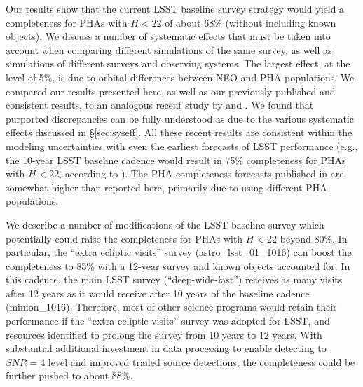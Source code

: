 Our results show that the current LSST baseline survey strategy would yield a completeness for PHAs
with $H<22$ of about 68\% (without including known objects). 
We discuss a number of systematic effects that must be taken into
account when comparing different simulations of the same survey, as well as simulations of different
surveys and observing systems. The largest effect, at the level of 5\%, is due to orbital differences
between NEO and PHA populations. We compared our results presented here, as well as our previously
published and consistent results, to an analogous recent study by \citet[]{GMS2016} and \citet{VeresChesley2017neo}. 
We found that purported discrepancies can be fully understood as due to the various systematic effects discussed in
\S\ref{sec:syseff}. All these recent results are consistent within the modeling uncertainties
with even the earliest forecasts of LSST performance (e.g., the 10-year LSST baseline cadence would 
result in 75\% completeness for PHAs with $H<22$, according to \citealt{IvezicNEO2007}). The 
PHA completeness forecasts published in \cite{LSSToverview} are somewhat higher than reported
here, primarily due to using different PHA populations. 

We describe a number of modifications of the LSST baseline survey which potentially could raise the
completeness for PHAs with $H<22$ beyond 80\%. In particular, the ``extra ecliptic visits'' survey
(astro\_lsst\_01\_1016) can boost the completeness to 85\% with a 12-year survey and known objects
accounted for. In this cadence, the main LSST survey (``deep-wide-fast'')
receives as many visits after 12 years as it would receive after 10 years of the
baseline cadence (minion\_1016). Therefore, most of other science programs would
retain their performance if the ``extra ecliptic visits'' survey was adopted for
LSST, and resources identified to prolong the survey from 10 years to 12 years. With substantial additional
investment in data processing to enable detecting to $SNR=4$ level and improved trailed source detections,
the completeness could be further pushed to about 88\%.
